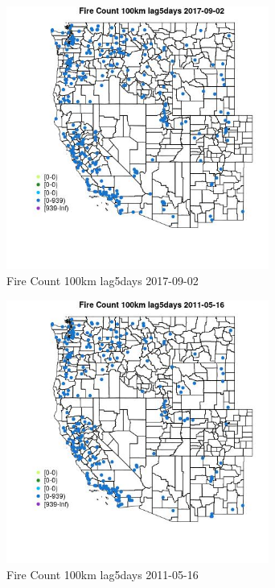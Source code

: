 \begin{figure} 
\centering  
\includegraphics[width=0.77\textwidth]{Code_Outputs/Report_ML_input_PM25_Step4_part_e_de_duplicated_aves_compiled_2019-05-21wNAs_MapObsFire_Count_100km_lag5days2017-09-02.jpg} 
\caption{\label{fig:Report_ML_input_PM25_Step4_part_e_de_duplicated_aves_compiled_2019-05-21wNAsMapObsFire_Count_100km_lag5days2017-09-02}Fire Count 100km lag5days 2017-09-02} 
\end{figure} 
 

\begin{figure} 
\centering  
\includegraphics[width=0.77\textwidth]{Code_Outputs/Report_ML_input_PM25_Step4_part_e_de_duplicated_aves_compiled_2019-05-21wNAs_MapObsFire_Count_100km_lag5days2011-05-16.jpg} 
\caption{\label{fig:Report_ML_input_PM25_Step4_part_e_de_duplicated_aves_compiled_2019-05-21wNAsMapObsFire_Count_100km_lag5days2011-05-16}Fire Count 100km lag5days 2011-05-16} 
\end{figure} 
 

